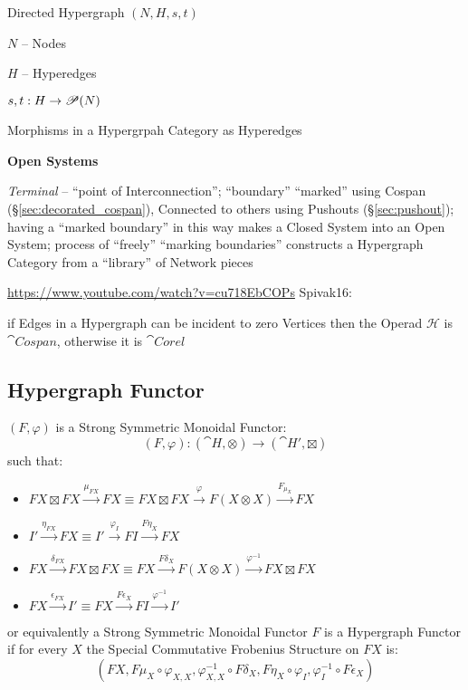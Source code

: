 Directed Hypergraph $(N,H,s,t)$

$N$ -- Nodes

$H$ -- Hyperedges

$s,t : H \rightarrow \mathscr{P}(N)$

Morphisms in a Hypergrpah Category as Hyperedges


\textbf{Open Systems}

\emph{Terminal} -- ``point of Interconnection''; ``boundary''
``marked'' using Cospan (\S\ref{sec:decorated_cospan}), Connected to
others using Pushouts (\S\ref{sec:pushout}); having a ``marked
boundary'' in this way makes a Closed System into an Open System;
process of ``freely'' ``marking boundaries'' constructs a Hypergraph
Category from a ``library'' of Network pieces


\asterism

\url{https://www.youtube.com/watch?v=cu718EbCOPs} Spivak16:

if Edges in a Hypergraph can be incident to zero Vertices then the
Operad $\mathcal{H}$ is $\cat{Cospan}$, otherwise it is $\cat{Corel}$




\subsection{Hypergraph Functor}\label{sec:hypergraph_functor}

$(F,\varphi)$ is a Strong Symmetric Monoidal Functor:
\[
  (F,\varphi) : (\cat{H},\otimes) \rightarrow (\cat{H}',\boxtimes)
\]
such that:
\begin{itemize}
  \item $FX \boxtimes FX \xrightarrow{\mu_{FX}} FX
    \equiv FX \boxtimes FX \xrightarrow{\varphi} F(X \otimes X)
      \xrightarrow{F_{\mu_X}} FX$
  \item $I' \xrightarrow{\eta_{FX}} FX
    \equiv I' \xrightarrow{\varphi_I} FI \xrightarrow{F \eta_X} FX$
  \item $FX \xrightarrow{\delta_{FX}} FX \boxtimes FX
    \equiv FX \xrightarrow{F\delta_X} F(X \otimes X)
      \xrightarrow{\varphi^{-1}} FX \boxtimes FX$
  \item $FX \xrightarrow{\epsilon_{FX}} I'
    \equiv FX \xrightarrow{F \epsilon_X} FI
      \xrightarrow{\varphi^{-1}} I'$
\end{itemize} %
or equivalently a Strong Symmetric Monoidal Functor $F$ is a
Hypergraph Functor if for every $X$ the Special Commutative Frobenius
Structure on $FX$ is:
\[
  (FX, F\mu_X \circ \varphi_{X,X}, \varphi^{-1}_{X,X} \circ F\delta_X,
    F\eta_X \circ \varphi_I, \varphi^{-1}_I \circ F\epsilon_X)
\]

